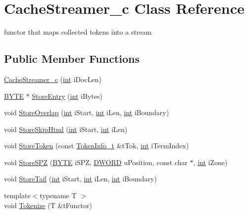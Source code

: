 \hypertarget{classCacheStreamer__c}{\section{Cache\-Streamer\-\_\-c Class Reference}
\label{classCacheStreamer__c}
}


functor that maps collected tokens into a stream  


\subsection*{Public Member Functions}
\begin{DoxyCompactItemize}
\item 
\hyperlink{classCacheStreamer__c_a223da4bbc80011da81470d0b0edef419}{Cache\-Streamer\-\_\-c} (\hyperlink{sphinxexpr_8cpp_a4a26e8f9cb8b736e0c4cbf4d16de985e}{int} i\-Doc\-Len)
\item 
\hyperlink{sphinxstd_8h_a4ae1dab0fb4b072a66584546209e7d58}{B\-Y\-T\-E} $\ast$ \hyperlink{classCacheStreamer__c_a0c66af28a459bd3ae44d84bdbf7569a0}{Store\-Entry} (\hyperlink{sphinxexpr_8cpp_a4a26e8f9cb8b736e0c4cbf4d16de985e}{int} i\-Bytes)
\item 
void \hyperlink{classCacheStreamer__c_a17831caee8f8087d3a0918cef7b27017}{Store\-Overlap} (\hyperlink{sphinxexpr_8cpp_a4a26e8f9cb8b736e0c4cbf4d16de985e}{int} i\-Start, \hyperlink{sphinxexpr_8cpp_a4a26e8f9cb8b736e0c4cbf4d16de985e}{int} i\-Len, \hyperlink{sphinxexpr_8cpp_a4a26e8f9cb8b736e0c4cbf4d16de985e}{int} i\-Boundary)
\item 
void \hyperlink{classCacheStreamer__c_aa7dd4f6c1a6ca08276a698d9a347bd2f}{Store\-Skip\-Html} (\hyperlink{sphinxexpr_8cpp_a4a26e8f9cb8b736e0c4cbf4d16de985e}{int} i\-Start, \hyperlink{sphinxexpr_8cpp_a4a26e8f9cb8b736e0c4cbf4d16de985e}{int} i\-Len)
\item 
void \hyperlink{classCacheStreamer__c_a7e9da4f68dac900a825175cc21325bad}{Store\-Token} (const \hyperlink{structTokenInfo__t}{Token\-Info\-\_\-t} \&t\-Tok, \hyperlink{sphinxexpr_8cpp_a4a26e8f9cb8b736e0c4cbf4d16de985e}{int} i\-Term\-Index)
\item 
void \hyperlink{classCacheStreamer__c_aa3383c298f78b8a73230314d2972d11b}{Store\-S\-P\-Z} (\hyperlink{sphinxstd_8h_a4ae1dab0fb4b072a66584546209e7d58}{B\-Y\-T\-E} i\-S\-P\-Z, \hyperlink{sphinxstd_8h_a798af1e30bc65f319c1a246cecf59e39}{D\-W\-O\-R\-D} u\-Position, const char $\ast$, \hyperlink{sphinxexpr_8cpp_a4a26e8f9cb8b736e0c4cbf4d16de985e}{int} i\-Zone)
\item 
void \hyperlink{classCacheStreamer__c_af9aec6648ca09c210e88a805aabe49da}{Store\-Tail} (\hyperlink{sphinxexpr_8cpp_a4a26e8f9cb8b736e0c4cbf4d16de985e}{int} i\-Start, \hyperlink{sphinxexpr_8cpp_a4a26e8f9cb8b736e0c4cbf4d16de985e}{int} i\-Len, \hyperlink{sphinxexpr_8cpp_a4a26e8f9cb8b736e0c4cbf4d16de985e}{int} i\-Boundary)
\item 
{\footnotesize template$<$typename T $>$ }\\void \hyperlink{classCacheStreamer__c_a22a9ed8049a3eca751c7972ec85e6486}{Tokenize} (T \&t\-Functor)
\end{DoxyCompactItemize}
